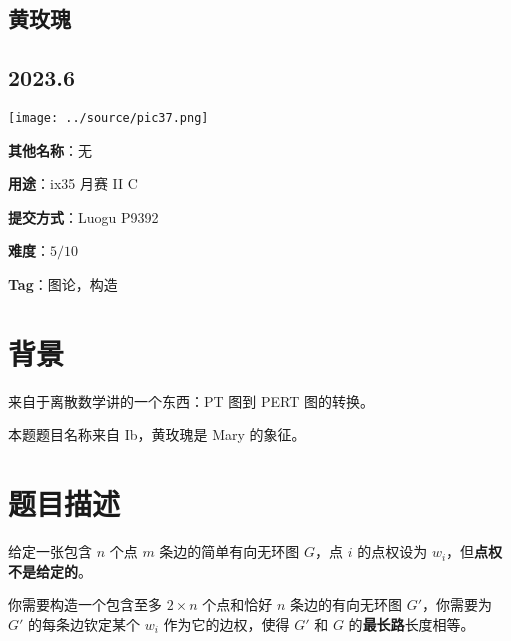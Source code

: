 \documentclass[a4paper,10pt]{article}
\begin{document}
\vspace*{\fill}
\begin{center}

\section{黄玫瑰}

\subsection*{2023.6}

\vspace{10pt}

\texttt{[image: ../source/pic37.png]}

\vspace{10pt}

\textbf{其他名称}：无

\vspace{10pt}

\textbf{用途}：ix35 月赛 II C

\vspace{10pt}

\textbf{提交方式}：Luogu P9392

\vspace{10pt}

\textbf{难度}：$5/10$

\vspace{10pt}

\textbf{Tag}：图论，构造

\end{center}
\vspace*{\fill}

\newpage

\section*{背景}

来自于离散数学讲的一个东西：PT 图到 PERT 图的转换。

本题题目名称来自 Ib，黄玫瑰是 Mary 的象征。

\section*{题目描述}

给定一张包含 $n$ 个点 $m$ 条边的简单有向无环图 $G$，点 $i$ 的点权设为 $w_i$，但\textbf{点权不是给定的}。

你需要构造一个包含至多 $2\times n$ 个点和恰好 $n$ 条边的有向无环图 $G'$，你需要为 $G'$ 的每条边钦定某个 $w_i$ 作为它的边权，使得 $G'$ 和 $G$ 的\textbf{最长路}长度相等。
\end{document}
